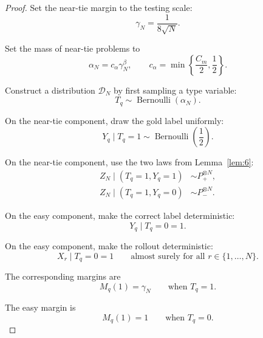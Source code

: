 \documentclass{article} %
\providecommand{\D}{\mathcal{D}}
\begin{document}
\begin{proof}
Set the near-tie margin to the testing scale:
\begin{equation}
\label{eq:thm3-proof-gamma}
\gamma_N=\frac{1}{8\sqrt N}.
\end{equation}

Set the mass of near-tie problems to
\begin{equation}
\label{eq:thm3-proof-alpha}
\alpha_N
=
c_\alpha \gamma_N^\beta,
\qquad
c_\alpha
=
\min\!\left\{\frac{C_m}{2},\frac12\right\}.
\end{equation}

Construct a distribution \(\D_N\) by first sampling a type variable:
\begin{equation}
\label{eq:thm3-proof-type}
T_q\sim\operatorname{Bernoulli}(\alpha_N).
\end{equation}

On the near-tie component, draw the gold label uniformly:
\begin{equation}
\label{eq:thm3-proof-y-near}
Y_q\mid T_q=1
\sim
\operatorname{Bernoulli}\!\left(\frac12\right).
\end{equation}

On the near-tie component, use the two laws from Lemma~\ref{lem:6}:
\begin{align}
Z_N\mid (T_q=1,Y_q=1)
&\sim
P_+^{\otimes N},
\label{eq:thm3-proof-near-plus}
\\
Z_N\mid (T_q=1,Y_q=0)
&\sim
P_-^{\otimes N}.
\label{eq:thm3-proof-near-minus}
\end{align}

On the easy component, make the correct label deterministic:
\begin{equation}
\label{eq:thm3-proof-y-easy}
Y_q\mid T_q=0=1.
\end{equation}

On the easy component, make the rollout deterministic:
\begin{equation}
\label{eq:thm3-proof-x-easy}
X_r\mid T_q=0=1
\qquad
\text{almost surely for all }r\in\{1,\ldots,N\}.
\end{equation}

The corresponding margins are
\begin{equation}
\label{eq:thm3-proof-margin-near}
M_q(1)=\gamma_N
\qquad
\text{when }T_q=1.
\end{equation}

The easy margin is
\begin{equation}
\label{eq:thm3-proof-margin-easy}
M_q(1)=1
\qquad
\text{when }T_q=0.
\end{equation}


\end{proof}
\end{document}
